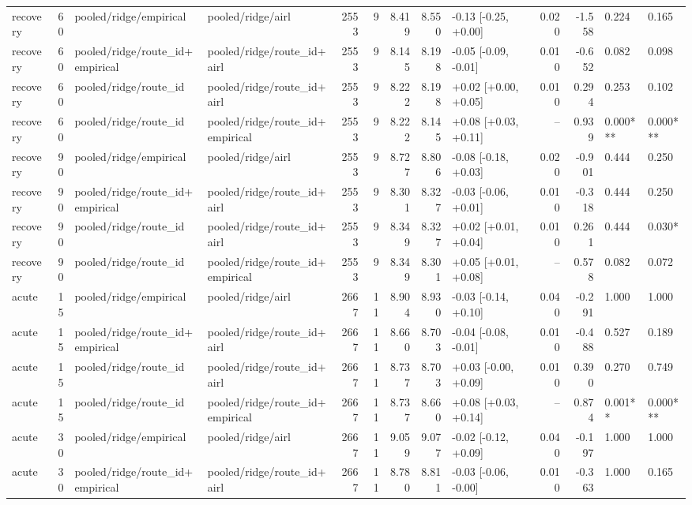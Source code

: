 \begin{tabular}{lrllrrrrlrrll}
recovery & 60 & pooled/ridge/empirical & pooled/ridge/airl & 2553 & 9 & 8.419 & 8.550 & -0.13 [-0.25, +0.00] & 0.020 & -1.558 & 0.224 & 0.165 \\
recovery & 60 & pooled/ridge/route_id+empirical & pooled/ridge/route_id+airl & 2553 & 9 & 8.145 & 8.198 & -0.05 [-0.09, -0.01] & 0.010 & -0.652 & 0.082 & 0.098 \\
recovery & 60 & pooled/ridge/route_id & pooled/ridge/route_id+airl & 2553 & 9 & 8.222 & 8.198 & +0.02 [+0.00, +0.05] & 0.010 & 0.294 & 0.253 & 0.102 \\
recovery & 60 & pooled/ridge/route_id & pooled/ridge/route_id+empirical & 2553 & 9 & 8.222 & 8.145 & +0.08 [+0.03, +0.11] & -- & 0.939 & 0.000*** & 0.000*** \\
recovery & 90 & pooled/ridge/empirical & pooled/ridge/airl & 2553 & 9 & 8.727 & 8.806 & -0.08 [-0.18, +0.03] & 0.020 & -0.901 & 0.444 & 0.250 \\
recovery & 90 & pooled/ridge/route_id+empirical & pooled/ridge/route_id+airl & 2553 & 9 & 8.301 & 8.327 & -0.03 [-0.06, +0.01] & 0.010 & -0.318 & 0.444 & 0.250 \\
recovery & 90 & pooled/ridge/route_id & pooled/ridge/route_id+airl & 2553 & 9 & 8.349 & 8.327 & +0.02 [+0.01, +0.04] & 0.010 & 0.261 & 0.444 & 0.030* \\
recovery & 90 & pooled/ridge/route_id & pooled/ridge/route_id+empirical & 2553 & 9 & 8.349 & 8.301 & +0.05 [+0.01, +0.08] & -- & 0.578 & 0.082 & 0.072 \\
acute & 15 & pooled/ridge/empirical & pooled/ridge/airl & 2667 & 11 & 8.904 & 8.930 & -0.03 [-0.14, +0.10] & 0.040 & -0.291 & 1.000 & 1.000 \\
acute & 15 & pooled/ridge/route_id+empirical & pooled/ridge/route_id+airl & 2667 & 11 & 8.660 & 8.703 & -0.04 [-0.08, -0.01] & 0.010 & -0.488 & 0.527 & 0.189 \\
acute & 15 & pooled/ridge/route_id & pooled/ridge/route_id+airl & 2667 & 11 & 8.737 & 8.703 & +0.03 [-0.00, +0.09] & 0.010 & 0.390 & 0.270 & 0.749 \\
acute & 15 & pooled/ridge/route_id & pooled/ridge/route_id+empirical & 2667 & 11 & 8.737 & 8.660 & +0.08 [+0.03, +0.14] & -- & 0.874 & 0.001** & 0.000*** \\
acute & 30 & pooled/ridge/empirical & pooled/ridge/airl & 2667 & 11 & 9.059 & 9.077 & -0.02 [-0.12, +0.09] & 0.040 & -0.197 & 1.000 & 1.000 \\
acute & 30 & pooled/ridge/route_id+empirical & pooled/ridge/route_id+airl & 2667 & 11 & 8.780 & 8.811 & -0.03 [-0.06, -0.00] & 0.010 & -0.363 & 1.000 & 0.165 \\

\end{tabular}
